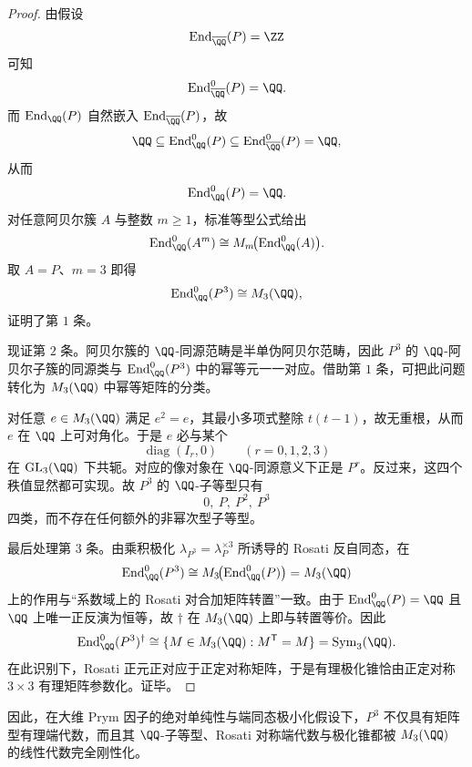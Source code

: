 \begin{proof}
由假设
\[
\operatorname{End}_{\overline{\QQ}}(P)=\ZZ
\]
可知
\[
\operatorname{End}_{\overline{\QQ}}^0(P)=\QQ.
\]
而 \(\operatorname{End}_{\QQ}(P)\) 自然嵌入 \(\operatorname{End}_{\overline{\QQ}}(P)\)，故
\[
\QQ\subseteq \operatorname{End}_{\QQ}^0(P)\subseteq \operatorname{End}_{\overline{\QQ}}^0(P)=\QQ,
\]
从而
\[
\operatorname{End}_{\QQ}^0(P)=\QQ.
\]
对任意阿贝尔簇 \(A\) 与整数 \(m\ge 1\)，标准等型公式给出
\[
\operatorname{End}_{\QQ}^0(A^m)\cong M_m\!\bigl(\operatorname{End}_{\QQ}^0(A)\bigr).
\]
取 \(A=P\)、\(m=3\) 即得
\[
\operatorname{End}_{\QQ}^0(P^3)\cong M_3(\QQ),
\]
证明了第 \(1\) 条。

现证第 \(2\) 条。阿贝尔簇的 \(\QQ\)-同源范畴是半单伪阿贝尔范畴，因此 \(P^3\) 的 \(\QQ\)-阿贝尔子簇的同源类与 \(\operatorname{End}_{\QQ}^0(P^3)\) 中的幂等元一一对应。借助第 \(1\) 条，可把此问题转化为 \(M_3(\QQ)\) 中幂等矩阵的分类。

对任意 \(e\in M_3(\QQ)\) 满足 \(e^2=e\)，其最小多项式整除 \(t(t-1)\)，故无重根，从而 \(e\) 在 \(\QQ\) 上可对角化。于是 \(e\) 必与某个
\[
\operatorname{diag}(I_r,0)\qquad (r=0,1,2,3)
\]
在 \(\operatorname{GL}_3(\QQ)\) 下共轭。对应的像对象在 \(\QQ\)-同源意义下正是 \(P^r\)。反过来，这四个秩值显然都可实现。故 \(P^3\) 的 \(\QQ\)-子等型只有
\[
0,\ P,\ P^2,\ P^3
\]
四类，而不存在任何额外的非幂次型子等型。

最后处理第 \(3\) 条。由乘积极化 \(\lambda_{P^3}=\lambda_P^{\times 3}\) 所诱导的 Rosati 反自同态，在
\[
\operatorname{End}_{\QQ}^0(P^3)\cong M_3\!\bigl(\operatorname{End}_{\QQ}^0(P)\bigr)=M_3(\QQ)
\]
上的作用与“系数域上的 Rosati 对合加矩阵转置”一致。由于 \(\operatorname{End}_{\QQ}^0(P)=\QQ\) 且 \(\QQ\) 上唯一正反演为恒等，故 \(\dagger\) 在 \(M_3(\QQ)\) 上即与转置等价。因此
\[
\operatorname{End}_{\QQ}^0(P^3)^{\dagger}
\cong
\{M\in M_3(\QQ):M^{\mathsf T}=M\}
=
\operatorname{Sym}_3(\QQ).
\]
在此识别下，Rosati 正元正对应于正定对称矩阵，于是有理极化锥恰由正定对称 \(3\times 3\) 有理矩阵参数化。证毕。
\end{proof}

\noindent
因此，在大维 Prym 因子的绝对单纯性与端同态极小化假设下，\(P^3\) 不仅具有矩阵型有理端代数，而且其 \(\QQ\)-子等型、Rosati 对称端代数与极化锥都被 \(M_3(\QQ)\) 的线性代数完全刚性化。

\endinput

